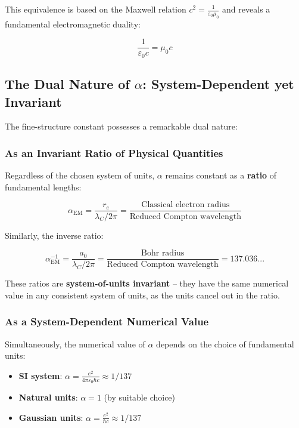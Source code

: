 This equivalence is based on the Maxwell relation $c^2 = \frac{1}{\varepsilon_0\mu_0}$ and reveals a fundamental electromagnetic duality:

\begin{equation}
	\frac{1}{\varepsilon_0 c} = \mu_0 c
	\label{eq:em_duality}
\end{equation}

\subsection{The Dual Nature of $\alpha$: System-Dependent yet Invariant}
\label{subsec:double_nature}

The fine-structure constant possesses a remarkable dual nature:

\subsubsection{As an Invariant Ratio of Physical Quantities}
\label{subsubsec:invariant_ratio}

Regardless of the chosen system of units, $\alpha$ remains constant as a \textbf{ratio} of fundamental lengths:

\begin{equation}
	\alpha_{\text{EM}} = \frac{r_e}{\lambda_C/2\pi} = \frac{\text{Classical electron radius}}{\text{Reduced Compton wavelength}}
	\label{eq:alpha_ratio_re}
\end{equation}

Similarly, the inverse ratio:

\begin{equation}
	\alpha_{\text{EM}}^{-1} = \frac{a_0}{\lambda_C/2\pi} = \frac{\text{Bohr radius}}{\text{Reduced Compton wavelength}} = 137.036...
	\label{eq:alpha_ratio_bohr}
\end{equation}

These ratios are \textbf{system-of-units invariant} -- they have the same numerical value in any consistent system of units, as the units cancel out in the ratio.

\subsubsection{As a System-Dependent Numerical Value}
\label{subsubsec:system_dependent}

Simultaneously, the numerical value of $\alpha$ depends on the choice of fundamental units:

\begin{itemize}
	\item \textbf{SI system}: $\alpha = \frac{e^2}{4\pi\varepsilon_0\hbar c} \approx 1/137$
	\item \textbf{Natural units}: $\alpha = 1$ (by suitable choice)
	\item \textbf{Gaussian units}: $\alpha = \frac{e^2}{\hbar c} \approx 1/137$
\end{itemize}

